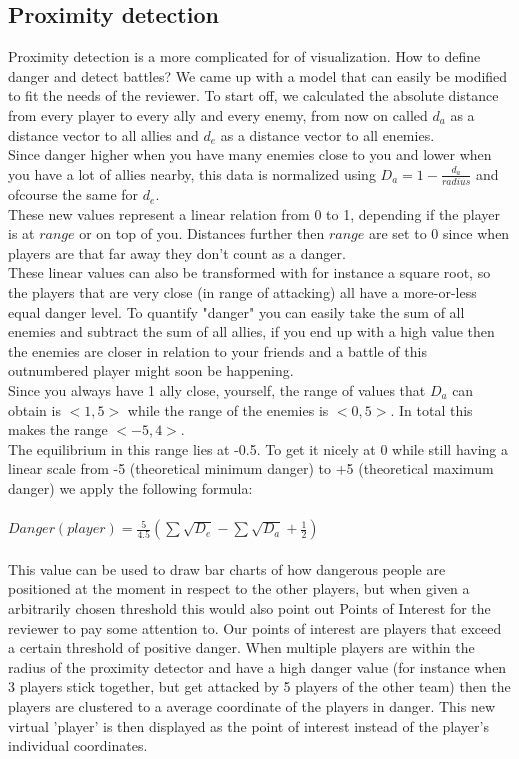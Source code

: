 \documentclass[a4paper]{article}
\theoremstyle{plain} %
\theoremstyle{definition} %
\begin{document}
\subsection*{Proximity detection}
Proximity detection is a more complicated for of visualization. How to define danger and detect battles? We came up with a model that can easily be modified to fit the needs of the reviewer. To start off, we calculated the absolute distance from every player to every ally and every enemy, from now on called $d_a$ as a distance vector to all allies and $d_e$ as a distance vector to all enemies.\\
Since danger higher when you have many enemies close to you and lower when you have a lot of allies nearby, this data is normalized using $D_a = 1- \frac{d_a}{radius}$ and ofcourse the same for $d_e$.\\
These new values represent a linear relation from 0 to 1, depending if the player is at $range$ or on top of you. Distances further then $range$ are set to 0 since when players are that far away they don't count as a danger.\\
These linear values can also be transformed with for instance a square root, so the players that are very close (in range of attacking) all have a more-or-less equal danger level. To quantify "danger" you can easily take the sum of all enemies and subtract the sum of all allies, if you end up with a high value then the enemies are closer in relation to your friends and a battle of this outnumbered player might soon be happening. \\
Since you always have 1 ally close, yourself, the range of values that $D_a$ can obtain is $<1,5>$ while the range of the enemies is $<0,5>$. In total this makes the range $<-5,4>$. \\
The equilibrium in this range lies at -0.5. To get it nicely at 0 while still having a linear scale from -5 (theoretical minimum danger) to +5 (theoretical maximum danger) we apply the following formula:\\
\\
$Danger(player) = \frac{5}{4.5}(\sum{\sqrt{D_e}}-\sum{\sqrt{D_a}}+\frac{1}{2})$\\
\\
This value can be used to draw bar charts of how dangerous people are positioned at the moment in respect to the other players, but when given a arbitrarily chosen threshold this would also point out Points of Interest for the reviewer to pay some attention to. Our points of interest are players that exceed a certain threshold of positive danger. When multiple players are within the radius of the proximity detector and have a high danger value (for instance when 3 players stick together, but get attacked by 5 players of the other team) then the players are clustered to a average coordinate of the players in danger. This new virtual 'player' is then displayed as the point of interest instead of the player's individual coordinates.
\newpage
\end{document}
